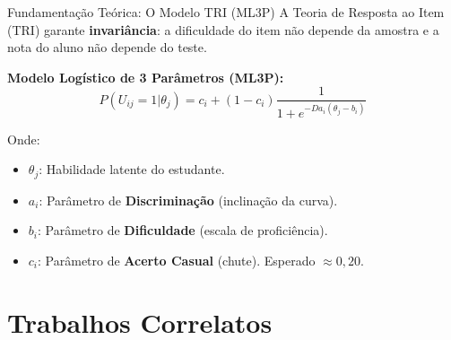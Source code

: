 \documentclass[10pt, aspectratio=169]{beamer}
\begin{document}
\begin{frame}{Fundamentação Teórica: O Modelo TRI (ML3P)}
    A Teoria de Resposta ao Item (TRI) garante \textbf{invariância}: a dificuldade do item não depende da amostra e a nota do aluno não depende do teste.
    
    \vspace{0.3cm}
    \textbf{Modelo Logístico de 3 Parâmetros (ML3P):}
    $$ P(U_{ij}=1|\theta_{j}) = c_{i} + (1-c_{i})\frac{1}{1+e^{-Da_{i}(\theta_{j}-b_{i})}} $$
    
    Onde:
    \begin{itemize}
        \item $\theta_{j}$: Habilidade latente do estudante.
        \item $a_{i}$: Parâmetro de \textbf{Discriminação} (inclinação da curva).
        \item $b_{i}$: Parâmetro de \textbf{Dificuldade} (escala de proficiência).
        \item $c_{i}$: Parâmetro de \textbf{Acerto Casual} (chute). Esperado $\approx 0,20$.
    \end{itemize}
\end{frame}

\section{Trabalhos Correlatos}
\end{document}
